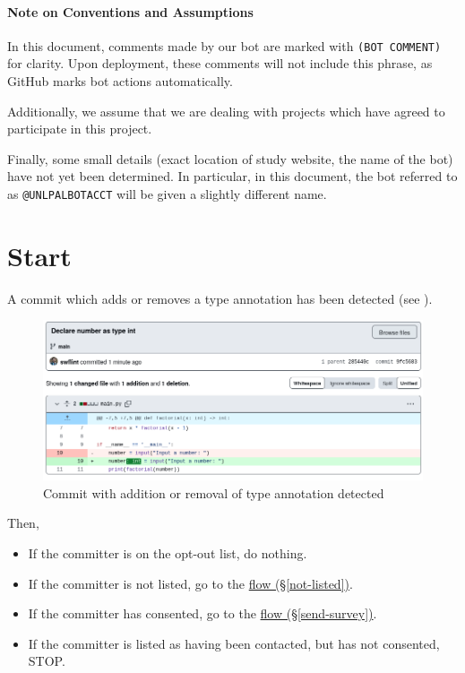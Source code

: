 \documentclass[paper=letter,fontsize=11pt,DIV=14]{scrartcl}
\newcommand{\flowref}[1]{\hyperref[{#1}]{\nameref*{#1} flow (\S \ref*{#1})}}
\begin{document}
\paragraph*{Note on Conventions and Assumptions}
\label{note-on-conventions-and-assumptions}

In this document, comments made by our bot are marked with \texttt{(BOT\ COMMENT)} for clarity.
Upon deployment, these comments will not include this phrase, as GitHub marks bot actions automatically.

Additionally, we assume that we are dealing with projects which have agreed to participate in this project.

Finally, some small details (exact location of study website, the name of the bot) have not yet been determined.
In particular, in this document, the bot referred to as \texttt{@UNLPALBOTACCT} will be given a slightly different name.

\section{Start}
\label{start}

A commit which adds or removes a type annotation has been detected (see ).

\begin{figure}[h]
\centering
\includegraphics[width=\linewidth,frame]{./commit-detected.png}
\caption{Commit with addition or removal of type annotation detected}
\label{fig:commit-detected}
\end{figure}

Then,
\begin{itemize}[noitemsep]
\item If the committer is on the opt-out list, do nothing.
\item If the committer is not listed, go to the \flowref{not-listed}.
\item If the committer has consented, go to the \flowref{send-survey}.
\item If the committer is listed as having been contacted, but has not consented, STOP.
\end{itemize}
\end{document}
